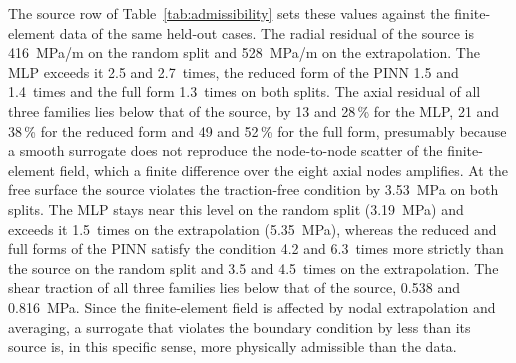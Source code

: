 \documentclass[subscriptcorrection,upint,varvw,barcolor=Goldenrod3,mathalfa=cal=euler,balance,hyphenate,french,pdf-a]{asmejour} %
\begin{document}
The source row of Table~\ref{tab:admissibility} sets these values against the finite-element data of the same held-out cases. The radial residual of the source is 416~MPa/m on the random split and 528~MPa/m on the extrapolation. The MLP exceeds it 2.5 and 2.7~times, the reduced form of the PINN 1.5 and 1.4~times and the full form 1.3~times on both splits. The axial residual of all three families lies below that of the source, by 13 and 28\,\% for the MLP, 21 and 38\,\% for the reduced form and 49 and 52\,\% for the full form, presumably because a smooth surrogate does not reproduce the node-to-node scatter of the finite-element field, which a finite difference over the eight axial nodes amplifies. At the free surface the source violates the traction-free condition by 3.53~MPa on both splits. The MLP stays near this level on the random split (3.19~MPa) and exceeds it 1.5~times on the extrapolation (5.35~MPa), whereas the reduced and full forms of the PINN satisfy the condition 4.2 and 6.3~times more strictly than the source on the random split and 3.5 and 4.5~times on the extrapolation. The shear traction of all three families lies below that of the source, 0.538 and 0.816~MPa. Since the finite-element field is affected by nodal extrapolation and averaging, a surrogate that violates the boundary condition by less than its source is, in this specific sense, more physically admissible than the data.
\end{document}
